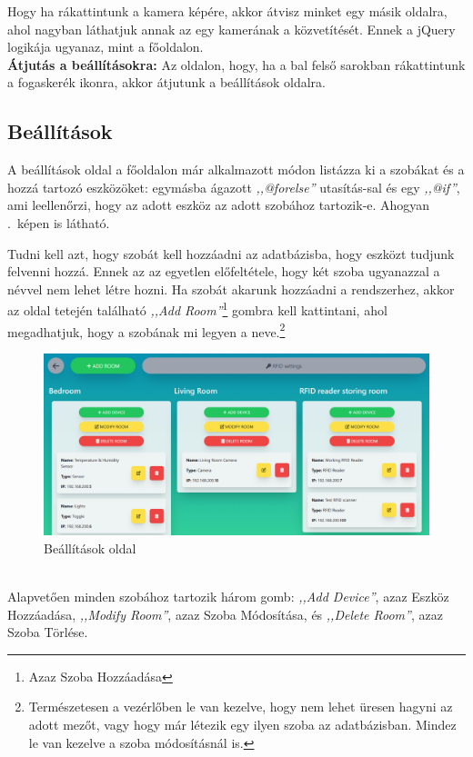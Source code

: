 \documentclass[
]{thesis-ekf}
\theoremstyle{definition}
\theoremstyle{remark}
\begin{document}
	Hogy ha rákattintunk a kamera képére, akkor átvisz minket egy másik oldalra, ahol nagyban láthatjuk annak az egy kamerának a közvetítését. Ennek a jQuery logikája ugyanaz, mint a főoldalon.\\
	\textbf{Átjutás a beállításokra:}
	Az oldalon, hogy, ha a bal felső sarokban rákattintunk a fogaskerék ikonra, akkor átjutunk a beállítások oldalra.
	\subsection{Beállítások}
	A beállítások oldal a főoldalon már alkalmazott módon listázza ki a szobákat és a hozzá tartozó eszközöket: egymásba ágazott \emph{,,@forelse''} utasítás-sal és egy \emph{,,@if''}, ami leellenőrzi, hogy az adott eszköz az adott szobához tartozik-e. Ahogyan .~képen is látható.
	
	Tudni kell azt, hogy szobát kell hozzáadni az adatbázisba, hogy eszközt tudjunk felvenni hozzá. Ennek az az egyetlen előfeltétele, hogy két szoba ugyanazzal a névvel nem lehet létre hozni. Ha szobát akarunk hozzáadni a rendszerhez, akkor az oldal tetején található \emph{,,Add Room''}\footnote{Azaz Szoba Hozzáadása} gombra kell kattintani, ahol megadhatjuk, hogy a szobának mi legyen a neve.\footnote{Természetesen a vezérlőben le van kezelve, hogy nem lehet üresen hagyni az adott mezőt, vagy hogy már létezik egy ilyen szoba az adatbázisban. Mindez le van kezelve a szoba módosításnál is.}
	\begin{figure}[ht!]
		\centering
		\includegraphics[width=1\textwidth]{./src/pages_img/settings}
		\caption{Beállítások oldal}
		\label{settings}
	\end{figure}\\
	Alapvetően minden szobához tartozik három gomb: \emph{,,Add Device''}, azaz Eszköz Hozzáadása, \emph{,,Modify Room''}, azaz Szoba Módosítása, és \emph{,,Delete Room''}, azaz Szoba Törlése. 
	
\end{document}
